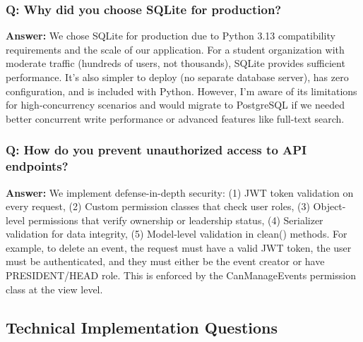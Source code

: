 \documentclass[11pt,a4paper]{article}
\begin{document}
\subsubsection{Q: Why did you choose SQLite for production?}
\textbf{Answer:} We chose SQLite for production due to Python 3.13 compatibility requirements and the scale of our application. For a student organization with moderate traffic (hundreds of users, not thousands), SQLite provides sufficient performance. It's also simpler to deploy (no separate database server), has zero configuration, and is included with Python. However, I'm aware of its limitations for high-concurrency scenarios and would migrate to PostgreSQL if we needed better concurrent write performance or advanced features like full-text search.

\subsubsection{Q: How do you prevent unauthorized access to API endpoints?}
\textbf{Answer:} We implement defense-in-depth security: (1) JWT token validation on every request, (2) Custom permission classes that check user roles, (3) Object-level permissions that verify ownership or leadership status, (4) Serializer validation for data integrity, (5) Model-level validation in clean() methods. For example, to delete an event, the request must have a valid JWT token, the user must be authenticated, and they must either be the event creator or have PRESIDENT/HEAD role. This is enforced by the CanManageEvents permission class at the view level.

\subsection{Technical Implementation Questions}
\end{document}
